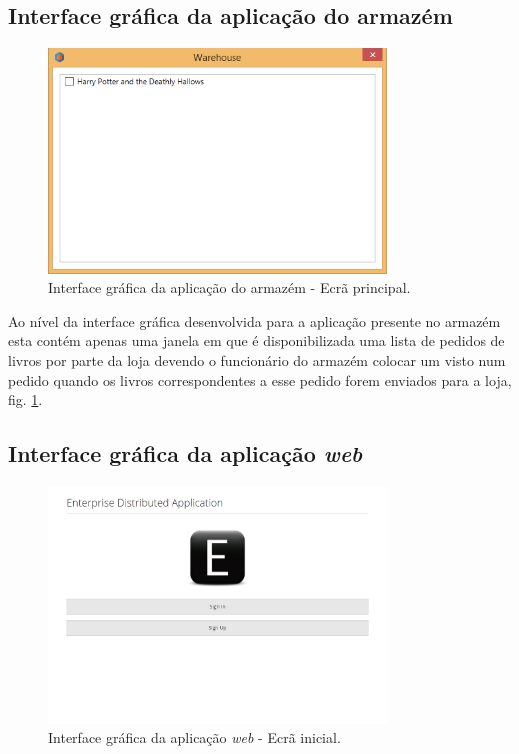 \documentclass[12pt]{article}
\begin{document}
\subsection{Interface gráfica da aplicação do armazém}

\begin{figure}[H]
    \centering
    \includegraphics[width=0.8\textwidth]{Warehouse_GUI_Main.png}
    \caption{Interface gráfica da aplicação do armazém - Ecrã principal.}
    \label{fig:c5}
\end{figure}

Ao nível da interface gráfica desenvolvida para a aplicação presente no armazém esta contém apenas uma janela em que é disponibilizada uma lista de pedidos de livros por parte da loja devendo o funcionário do armazém colocar um visto num pedido quando os livros correspondentes a esse pedido forem enviados para a loja, fig. \ref{fig:c5}.

\subsection{Interface gráfica da aplicação \textit{web}}

\begin{figure}[H]
    \centering
    \includegraphics[width=0.8\textwidth]{Web_Initial.png}
    \caption{Interface gráfica da aplicação \textit{web} - Ecrã inicial.}
    \label{fig:c6}
\end{figure}
\end{document}
